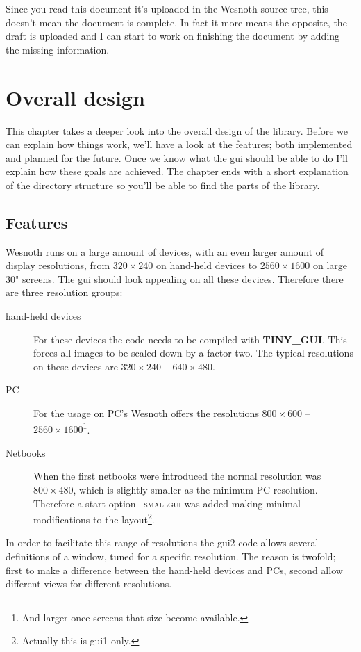 \documentclass[a4paper,notitlepage,twocolumn,draft]{report}
\begin{document}
Since you read this document it's uploaded in the Wesnoth source tree, this
doesn't mean the document is complete. In fact it more means the opposite, the
draft is uploaded and I can start to work on finishing the document by adding
the missing information.


\chapter{Overall design}

This chapter takes a deeper look into the overall design of the library. Before
we can explain how things work, we'll have a look at the features; both
implemented and planned for the future. Once we know what the gui should be able
to do I'll explain how these goals are achieved. The chapter ends with a short
explanation of the directory structure so you'll be able to find the parts of
the library.

\section{Features}

Wesnoth runs on a large amount of devices, with an even larger amount of display
resolutions, from $320\times 240$ on hand-held devices to $2560\times 1600$ on
large 30" screens. The gui should look appealing on all these devices. Therefore
there are three resolution groups:
\begin{description}
\item[hand-held devices] For these devices the code needs to be compiled with
\textbf{TINY\_GUI}. This forces all images to be scaled down by a factor two.
	The typical resolutions on these devices are $320\times 240$ -- $640\times
	480$.
\item[PC] For the usage on PC's Wesnoth offers the resolutions $800\times 600$
	-- $2560\times 1600$\footnote{And larger once screens that size become
	available.}.
\item[Netbooks] When the first netbooks were introduced the normal resolution
	was $800\times 480$, which is slightly smaller as the minimum PC resolution.
	Therefore a start option \textsc{--smallgui} was added making minimal
	modifications to the layout\footnote{Actually this is gui1 only.}.
\end{description}

In order to facilitate this range of resolutions the gui2 code allows several
definitions of a window, tuned for a specific resolution. The reason is twofold;
first to make a difference between the hand-held devices and PCs, second allow
different views for different resolutions.
\end{document}
